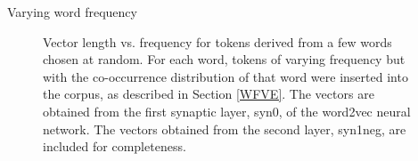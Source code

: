 \documentclass{article} %
\begin{document}
\begin{section}{Varying word frequency}
\begin{figure}
	\caption{ Vector length vs. frequency for tokens derived from a
          few words chosen at random.  For each word, tokens of varying
          frequency but with the co-occurrence distribution of that word
          were inserted into the corpus, as described in
          Section \ref{WFVE}.  The vectors are obtained from the first
          synaptic layer, syn0, of the word2vec neural network.  The
          vectors obtained from the second layer, syn1neg, are
          included for completeness.  }
	\label{fig:word-frequency-experiment-graph}
\end{figure}
\end{section}
\end{document}
